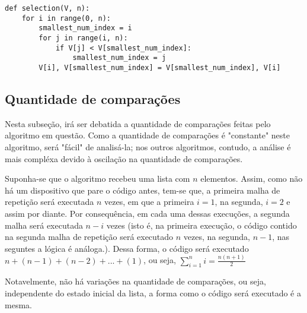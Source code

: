 \begin{lstlisting}
def selection(V, n):
    for i in range(0, n):
        smallest_num_index = i
        for j in range(i, n):
            if V[j] < V[smallest_num_index]:
                smallest_num_index = j
        V[i], V[smallest_num_index] = V[smallest_num_index], V[i]

\end{lstlisting}

\subsection{Quantidade de comparações}
Nesta subseção, irá ser debatida a quantidade de comparações feitas pelo algoritmo em questão. Como a quantidade de comparações é "constante" neste algoritmo, será "fácil" de analisá-la; nos outros algoritmos, contudo, a análise é mais compléxa devido à oscilação na quantidade de comparações.

Suponha-se que o algoritmo recebeu uma lista com $n$ elementos. Assim, como não há um dispositivo que pare o código antes, tem-se que, a primeira malha de repetição será executada $n$ vezes, em que a primeira $i=1$, na segunda, $i=2$ e assim por diante. Por consequência, em cada uma dessas execuções, a segunda malha será executada $n-i$ vezes (isto é, na primeira execução, o código contido na segunda malha de repetição será executado $n$ vezes, na segunda, $n-1$, nas seguntes a lógica é análoga.). Dessa forma, o código será executado $n+(n-1)+(n-2)+...+(1)$, ou seja, $\sum_{i=1}^n i = \frac{n(n+1)}{2}$

Notavelmente, não há variações na quantidade de comparações, ou seja, independente do estado inicial da lista, a forma como o código será executado é a mesma.